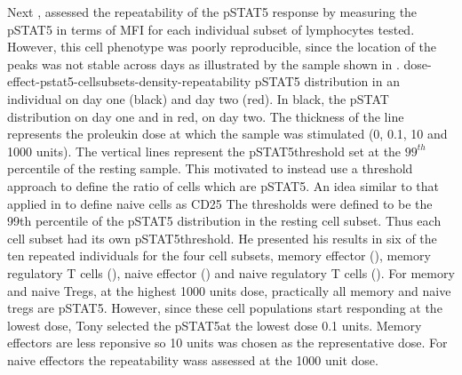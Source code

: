 Next , assessed the repeatability of the pSTAT5 response by measuring the pSTAT5 in terms of \gls{MFI}
for each individual subset of lymphocytes tested.
However, this cell phenotype was poorly reproducible, since the location of the peaks was not stable across days as illustrated
by the sample shown in .
{dose-effect-pstat5-cellsubsets-density-repeatability}
{ pSTAT5 distribution in an individual on day one (black) and day two (red). }
{
In black, the pSTAT distribution on day one and in red, on day two.
The thickness of the line represents the proleukin dose at which the sample was stimulated (0, 0.1, 10 and 1000 units).
The vertical lines represent the pSTAT5\positive threshold set at the $99^{th}$ percentile of the resting sample.
}
This motivated  to instead use a threshold approach to define the ratio of cells which are pSTAT5\positive.
An idea similar to that applied in  to define naive cells as CD25\positive
The thresholds were defined to be the 99th percentile of the pSTAT5 distribution in the resting cell subset.
Thus each cell subset had its own pSTAT5\positive threshold.
He presented his results in six of the ten repeated individuals for the four cell subsets,
memory effector (),
memory regulatory T cells (),
naive effector ()
and naive regulatory T cells ().
For memory and naive Tregs, at the highest 1000 units dose, practically all memory and naive tregs are pSTAT5\positive.
However, since these cell populations start responding at the lowest dose,
Tony selected the pSTAT5\positive at the lowest dose 0.1 units.
Memory effectors are less reponsive so 10 units was chosen as the representative dose.
For naive effectors the repeatability wass assessed at the 1000 unit dose.
